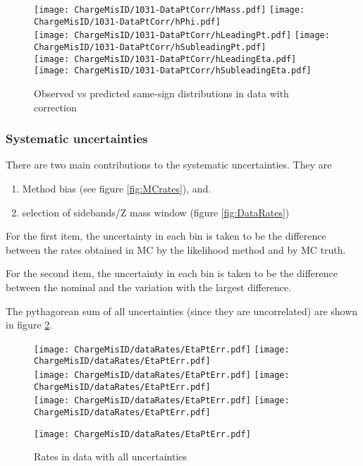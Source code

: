 \begin{figure}[h]
\centering
\texttt{[image: ChargeMisID/1031-DataPtCorr/hMass.pdf]}
\texttt{[image: ChargeMisID/1031-DataPtCorr/hPhi.pdf]}\\
\texttt{[image: ChargeMisID/1031-DataPtCorr/hLeadingPt.pdf]}
\texttt{[image: ChargeMisID/1031-DataPtCorr/hSubleadingPt.pdf]}\\
\texttt{[image: ChargeMisID/1031-DataPtCorr/hLeadingEta.pdf]}
\texttt{[image: ChargeMisID/1031-DataPtCorr/hSubleadingEta.pdf]}
\caption{Observed vs predicted same-sign distributions in data with \pT correction}
\label{fig:DataDistWPT}
\end{figure}

\subsubsection*{Systematic uncertainties}

There are two main contributions to the systematic uncertainties. They are

\begin{enumerate}
\item Method bias (see figure \ref{fig:MCrates}), and.
\item selection of sidebands/Z mass window (figure \ref{fig:DataRates})
\end{enumerate}

For the first item, the uncertainty in each bin is taken to be the difference between the rates obtained in MC by the likelihood method and by MC truth. 

For the second item, the uncertainty in each bin is taken to be the difference between the nominal and the variation with the largest difference. 

The pythagorean sum of all uncertainties (since they are uncorrelated) are shown in figure \ref{fig:DataRatesWErr}.

\begin{figure}[h]
\centering
\texttt{[image: ChargeMisID/dataRates/EtaPtErr.pdf]}
\texttt{[image: ChargeMisID/dataRates/EtaPtErr.pdf]}\\
\texttt{[image: ChargeMisID/dataRates/EtaPtErr.pdf]}
\texttt{[image: ChargeMisID/dataRates/EtaPtErr.pdf]}\\
\texttt{[image: ChargeMisID/dataRates/EtaPtErr.pdf]}
\texttt{[image: ChargeMisID/dataRates/EtaPtErr.pdf]}
\end{figure}

\begin{figure}[h]
\ContinuedFloat
\centering
\texttt{[image: ChargeMisID/dataRates/EtaPtErr.pdf]}
\caption{Rates in data with all uncertainties}
\label{fig:DataRatesWErr}
\end{figure}

\FloatBarrier
